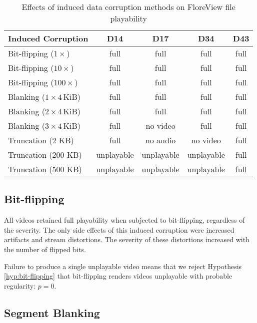 \begin{table}
    \centering
    \begin{tabular}{|l||c|c|c|c|}
        \hline
        \textbf{Induced Corruption} & \textbf{D14} & \textbf{D17} & \textbf{D34} & \textbf{D43} \\
        \hline \hline
        Bit-flipping ($1 \times$) & full & full & full & full \\
        Bit-flipping ($10 \times$) & full & full & full & full \\
        Bit-flipping ($100 \times$) & full & full & full & full \\
        \hline
        Blanking ($1\times 4\,\mathrm{KiB}$) & full & full & full & full \\
        Blanking ($2\times 4\,\mathrm{KiB}$) & full & full & full & full \\
        Blanking ($3\times 4\,\mathrm{KiB}$) & full & no video & full & full \\
        \hline
        Truncation (2 KB) & full & no audio & no video & full \\
        Truncation (200 KB) & unplayable & unplayable & unplayable & full \\
        Truncation (500 KB) & unplayable & unplayable & unplayable & full \\
        \hline
    \end{tabular}
    \caption{Effects of induced data corruption methods on FloreView file playability}
    \label{tab:corruption-playability}
\end{table}

\subsection{Bit-flipping}

All videos retained full playability when subjected to bit-flipping, regardless of the severity. The only side effects of this induced corruption were increased artifacts and stream distortions. The severity of these distortions increased with the number of flipped bits.

Failure to produce a single unplayable video means that we reject Hypothesis \ref{hyp:bit-flipping} that bit-flipping renders videos unplayable with probable regularity: \( p = 0 \).

\subsection{Segment Blanking}

